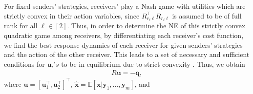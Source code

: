 \documentclass[12pt,journal,onecolumn]{IEEEtran}
\begin{document}
For fixed senders' strategies, receivers' play a Nash game with utilities which are strictly convex in their action variables, since $R_{{r_\ell}\ell}^\top R_{{r_\ell}\ell}$ is assumed to be of full rank for all $\ell\in[2]$. Thus, in order to determine the NE of this strictly convex quadratic game among receivers, by differentiating each receiver's cost function, we find the best response dynamics of each receiver for given senders' strategies and the action of the other receiver.  %
This leads to a set of necessary and sufficient conditions for $\boldsymbol{u}_i's$ to be in equilibrium due to strict convexity \cite{bacsar1998dynamic}. Thus, we obtain 
\begin{align}\label{eqn_mult_sen_mult_rec}
    R\boldsymbol{u}=-\boldsymbol{q},
\end{align}
where $\boldsymbol{u}=
    [\boldsymbol{u}_1^\top, \boldsymbol{u}_2^\top
]^\top$, $\hat{\boldsymbol{x}}=\mathbb{E}[\boldsymbol{x}|\boldsymbol{y}_1,\hdots,\boldsymbol{y}_m]$, and
\end{document}
